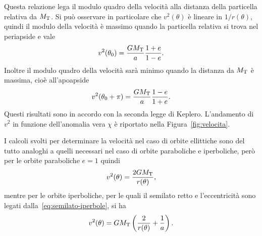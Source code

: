 {Questa relazione lega il modulo quadro della velocità alla
distanza della particella relativa da $M_\textup{T}$. Si può osservare in
particolare che $v^2(\theta)$ è lineare in $1/r(\theta)$, quindi il modulo della
velocità è massimo quando la particella relativa si trova nel periapside e vale
\begin{equation}
  v^2(\theta_0) = \frac{GM_\textup{T}}{a}\frac{1+e}{1-e}.
\end{equation}
Inoltre il modulo quadro della velocità sarà minimo quando la distanza da
$M_\textup{T}$ è massima, cioè all'apoapside
\begin{equation}
  v^2(\theta_0+\pi) = \frac{GM_\textup{T}}{a}\frac{1-e}{1+e}.
\end{equation}
Questi risultati sono in accordo con la seconda legge di Keplero. L'andamento di
$v^2$ in funzione dell'anomalia vera $\chi$ è riportato nella
Figura~\ref{fig:velocita}.

I calcoli svolti per determinare la velocità nel caso di orbite ellittiche sono
del tutto analoghi a quelli necessari nel caso di orbite paraboliche e
iperboliche, però per le orbite paraboliche $e=1$ quindi
\begin{equation}
  \label{eq:velocita-parabola}
  v^2(\theta) = \frac{2GM_\textup{T}}{r(\theta)},
\end{equation}
mentre per le orbite iperboliche, per le quali il semilato retto e
l'eccentricità sono legati dalla~\eqref{eq:semilato-iperbole}, si ha
\begin{equation}
  \label{eq:velocita-iperbole}
  v^2(\theta) = GM_\textup{T}
    \left(
      \frac{2}{r(\theta)} + \frac{1}{a}
    \right).
\end{equation}

}
